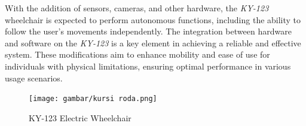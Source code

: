 With the addition of sensors, cameras, and other hardware, the \emph{KY-123} wheelchair is expected to perform autonomous functions, including the ability to follow the user's movements independently. The integration between hardware and software on the \emph{KY-123} is a key element in achieving a reliable and effective system. These modifications aim to enhance mobility and ease of use for individuals with physical limitations, ensuring optimal performance in various usage scenarios.

\begin{figure}[H]
  \centering
  \texttt{[image: gambar/kursi roda.png]}
  \caption{KY-123 Electric Wheelchair}
  \label{fig:KYElectricWheelchair}
\end{figure}